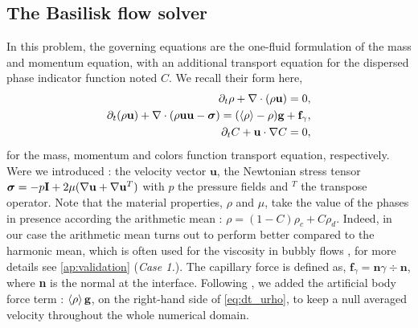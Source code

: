 \subsection{The Basilisk flow solver}


In this problem, the governing equations are the one-fluid formulation of the mass and momentum equation, with an additional transport equation for the dispersed phase indicator function noted $C$. 
We recall their form here, 
\begin{align}
    \partial_t \rho+ \mathbf{\nabla}\cdot(\rho\textbf{u})
    = 0,\\
    \label{eq:dt_urho}
    \partial_t (\rho \textbf{u})
    + \mathbf{\nabla}\cdot (\rho  \textbf{u} \textbf{u} - \bm\sigma)
    = (\left<\rho\right> - \rho)\textbf{g}
    + \textbf{f}_\gamma,\\
    \label{eq:dt_C}
    \partial_t C + \textbf{u}\cdot\mathbf{\nabla} C = 0,
\end{align}
for the mass, momentum and colors function transport equation, respectively. 
Were we introduced : the velocity vector $\textbf{u}$,  the Newtonian stress  tensor $\bm{\sigma} = -p \textbf{I} + 2\mu (\mathbf{\nabla} \textbf{u}+\mathbf{\nabla} \textbf{u}^T)$ with $p$ the pressure fields and $^T$ the transpose operator.
Note that the material properties, $\rho$ and $\mu$, take the value of the phases in presence according the arithmetic mean : $\rho = (1-C)\rho_c + C \rho_d$. 
Indeed, in our case the arithmetic mean turns out to perform better compared to the harmonic mean, which is often used for the viscosity in bubbly flows \citet{hidman2023assessing,innocenti2020direct}, for more details see \ref{ap:validation} (\textit{Case 1.}). 
The capillary force is defined as, $\textbf{f}_\gamma =\textbf{n} \gamma \div \textbf{n} $, where \textbf{n} is the normal at the interface.
Following  \citep{bunner2002dynamics}, we added the artificial body force term : $\left<\rho\right>\textbf{g}$, on the right-hand side of \ref{eq:dt_urho}, to keep a null averaged velocity throughout the whole numerical domain.  

